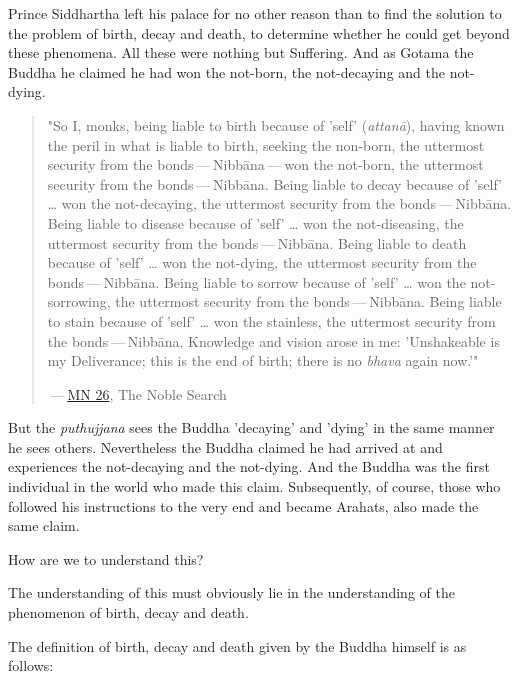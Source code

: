 Prince Siddhartha left his palace for no other reason than to find the
solution to the problem of birth, decay and death, to determine whether
he could get beyond these phenomena. All these were nothing but
Suffering. And as Gotama the Buddha he claimed he had won the not-born,
the not-decaying and the not-dying.


\begin{quotation}
"So I, monks, being liable to birth because of 'self' (\emph{attanā}),
having known the peril in what is liable to birth, seeking the non-born,
the uttermost security from the bonds — Nibbāna — won the not-born,
the uttermost security from the bonds — Nibbāna. Being liable to
decay because of 'self' …​ won the not-decaying, the uttermost security
from the bonds — Nibbāna. Being liable to disease because of 'self'
…​ won the not-diseasing, the uttermost security from the bonds — Nibbāna. Being liable to death because of 'self' …​ won the
not-dying, the uttermost security from the bonds — Nibbāna. Being
liable to sorrow because of 'self' …​ won the not-sorrowing, the
uttermost security from the bonds — Nibbāna. Being liable to stain
because of 'self' …​ won the stainless, the uttermost security from the
bonds — Nibbāna. Knowledge and vision arose in me: 'Unshakeable is
my Deliverance; this is the end of birth; there is no \emph{bhava} again now.'"


 — \href{https://suttacentral.net/mn26/en/bodhi}{MN 26}, The Noble Search


\end{quotation}

But the \emph{puthujjana} sees the Buddha 'decaying' and 'dying' in the same
manner he sees others. Nevertheless the Buddha claimed he had arrived at
and experiences the not-decaying and the not-dying. And the Buddha was
the first individual in the world who made this claim. Subsequently, of
course, those who followed his instructions to the very end and became
Arahats, also made the same claim.


How are we to understand this?


The understanding of this must obviously lie in the understanding of the
phenomenon of birth, decay and death.


The definition of birth, decay and death given by the Buddha himself is
as follows:


